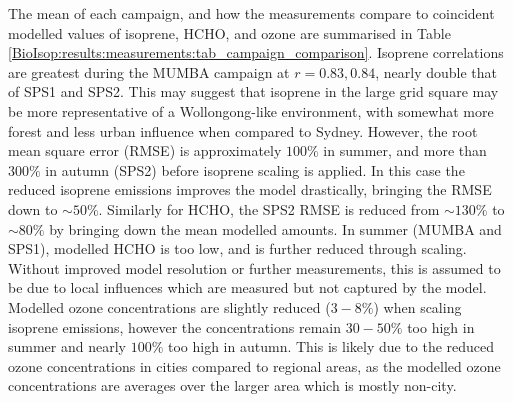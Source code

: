     
    The mean of each campaign, and how the measurements compare to coincident modelled values of isoprene, HCHO, and ozone are summarised in Table \ref{BioIsop:results:measurements:tab_campaign_comparison}.
    Isoprene correlations are greatest during the MUMBA campaign at $r=0.83,0.84$, nearly double that of SPS1 and SPS2.
    This may suggest that isoprene in the large grid square may be more representative of a Wollongong-like environment, with somewhat more forest and less urban influence when compared to Sydney.
    However, the root mean square error (RMSE) is approximately $100\%$ in summer, and more than $300\%$ in autumn (SPS2) before isoprene scaling is applied.
    In this case the reduced isoprene emissions improves the model drastically, bringing the RMSE down to $\sim{50}\%$.
    Similarly for HCHO, the SPS2 RMSE is reduced from $\sim{130}\%$ to $\sim{80}\%$ by bringing down the mean modelled amounts.
    In summer (MUMBA and SPS1), modelled HCHO is too low, and is further reduced through scaling.
    Without improved model resolution or further measurements, this is assumed to be due to local influences which are measured but not captured by the model.
    Modelled ozone concentrations are slightly reduced ($3-8\%$) when scaling isoprene emissions, however the concentrations remain $30-50\%$ too high in summer and nearly $100\%$ too high in autumn.
    This is likely due to the reduced ozone concentrations in cities compared to regional areas, as the modelled ozone concentrations are averages over the larger area which is mostly non-city.
    
